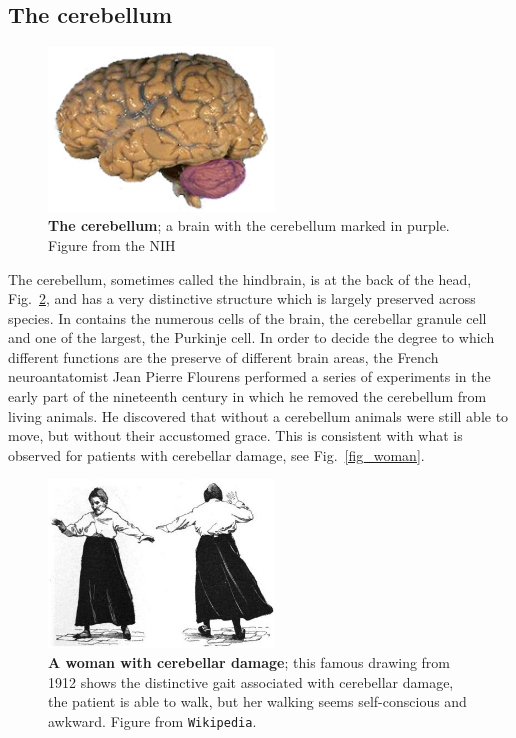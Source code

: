 \documentclass[12pt]{article}
\begin{document}
\subsection*{The cerebellum}


\begin{figure}[tbhp]
  \begin{center}
  \includegraphics[width=6cm]{cerebellum.png}
\end{center}
  \caption{\textbf{The cerebellum}; a brain with the cerebellum marked in purple. Figure from
    the NIH\label{fig_cerebellum}}
\end{figure}


The cerebellum, sometimes called the hindbrain, is at the back of the
head, Fig.~\ref{fig_cerebellum}, and has a very distinctive structure
which is largely preserved across species. In contains the numerous
cells of the brain, the cerebellar granule cell and one of the
largest, the Purkinje cell. In order to decide the degree to which
different functions are the preserve of different brain areas, the
French neuroantatomist Jean Pierre Flourens performed a series of
experiments in the early part of the nineteenth century in which he
removed the cerebellum from living animals. He discovered that without
a cerebellum animals were still able to move, but without their
accustomed grace. This is consistent with what is observed for
patients with cerebellar damage, see Fig.~\ref{fig_woman}.

\begin{figure}[tbhp]
  \begin{center}
  \includegraphics[width=6cm]{woman.png}
\end{center}
  \caption{\textbf{A woman with cerebellar damage}; this famous
    drawing from 1912 shows the distinctive gait associated with
    cerebellar damage, the patient is able to walk, but her walking
    seems self-conscious and awkward. Figure from
    \texttt{Wikipedia}.\label{fig_cerebellum}}
\end{figure}
\end{document}
